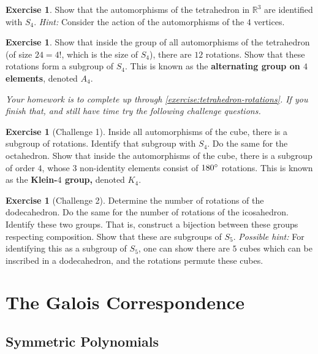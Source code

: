\documentclass[reqno, 12pt, letter]{article}
\theoremstyle{plain}
\theoremstyle{definition}
\newtheorem{exercise}[theorem]{Exercise}
\theoremstyle{remark}
\numberwithin{equation}{section}
\newcommand\br{{\mathbb R}}
\begin{document}
\begin{exercise}
	\label{exercise:}
	Show that the automorphisms of the tetrahedron in $\br^3$ are identified with $S_4$. {\it Hint:} Consider the action of the automorphisms of the $4$ vertices.
\end{exercise}
\begin{exercise}
	\label{exercise:tetrahedron-rotations}
	Show that inside the group of all automorphisms of the tetrahedron (of size $24 = 4!$, which is the size of $S_4$), there are $12$ rotations.
	Show that these rotations form a subgroup of $S_4$. This is known as the {\bf alternating group on $4$ elements}, denoted $A_4$.
\end{exercise}

{\it Your homework is to complete up through \autoref{exercise:tetrahedron-rotations}. If you finish that, and still have time try the following challenge questions.}

\begin{exercise}[Challenge 1]
	\label{exercise:}
	Inside all automorphisms of the cube, there is a subgroup of rotations. Identify that subgroup with $S_4$.
	Do the same for the octahedron.
	Show that inside the automorphisms of the cube, there is a subgroup of order $4$, whose $3$ non-identity elements consist of $180 \degree$ rotations.
	This is known as the {\bf Klein-$4$ group,} denoted $K_4$.
\end{exercise}
\begin{exercise}[Challenge 2]
	\label{exercise:}
	Determine the number of rotations of the dodecahedron. Do the same for the number of rotations of the icosahedron.
	Identify these two groups. That is, construct a bijection between these groups respecting composition.
	Show that these are subgroups of $S_5$. 
	{\it Possible hint:} For identifying this as a subgroup of $S_5$,
	one can show there are $5$ cubes which can be inscribed in a dodecahedron, and the rotations permute these cubes.
\end{exercise}




\newpage
\section{The Galois Correspondence}
	
	
	
	
	
	
	
	\subsection{Symmetric Polynomials}	
	
\end{document}
